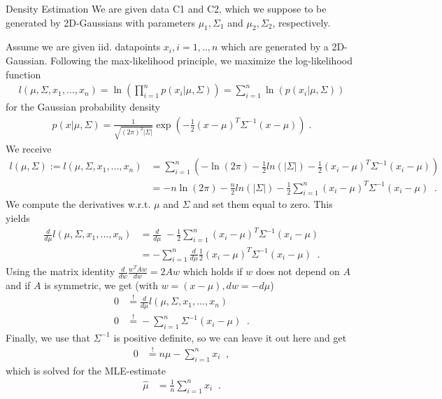 \documentclass[
ngerman,
]{tudaexercise}
\newcommand{\sni}{\sum_{i=1}^{n}}
\begin{document}
	\begin{task}{Density Estimation}
		We are given data C1 and C2, which we suppose to be generated by 2D-Gaussians with parameters ${\mu_1,\Sigma_1}$ and ${\mu_2,\Sigma_2}$, respectively.
		\begin{subtask}
	Assume we are given iid. datapoints $x_i, i=1,..,n$ which are generated by a 2D-Gaussian. Following the max-likelihood principle, we maximize the log-likelihood function
	\begin{align*}
	l(\mu,\Sigma,x_1,...,x_n)=\ln(\prod_{i=1}^n p(x_i|\mu,\Sigma))=\sni\ln(p(x_i|\mu,\Sigma))
	\end{align*}
	for the Gaussian probability density
	\begin{align}\label{gaussian} p(x|\mu,\Sigma)=\frac{1}{\sqrt{(2\pi)^2|\Sigma|}}\exp\left( -\frac{1}{2}(x-\mu)^T\Sigma^{-1}(x-\mu)\right)\;.
	\end{align}
	We receive
	\begin{align}
	l(\mu,\Sigma):=l(\mu,\Sigma,x_1,...,x_n)&=\sni\left( -\ln(2\pi)-\frac{1}{2}ln(|\Sigma|)-\frac{1}{2}(x_i-\mu)^T\Sigma^{-1}(x_i-\mu)\right) \\
	&=-n \ln(2\pi)-\frac{n}{2}ln(|\Sigma|)-\frac{1}{2}\sni (x_i-\mu)^T\Sigma^{-1}(x_i-\mu)\;\;.\label{lfkt}
	\end{align}
	We compute the derivatives w.r.t. $\mu$ and $\Sigma$ and set them equal to zero. This yields
	\begin{align*}
	\frac{d}{d\mu}l(\mu,\Sigma,x_1,...,x_n)&=\frac{d}{d\mu}\; -\frac{1}{2}\sni (x_i-\mu)^T\Sigma^{-1} (x_i-\mu)\\ &= -\sni \frac{d}{d\mu}\frac{1}{2}(x_i-\mu)^T\Sigma^{-1} (x_i-\mu)\;\;.
	\end{align*}
	Using the matrix identity $\frac{d}{dw}\frac{w^T Aw}{dw}=2Aw$ which holds if $w$ does not depend on $A$ and if $A$ is symmetric, we get (with $w=(x-\mu), dw=-d\mu$)
	\begin{align*}
	0&\stackrel{!}{=}\frac{d}{d\mu}l(\mu,\Sigma,x_1,...,x_n)\\
	0&\stackrel{!}{=}-\sni \Sigma^{-1}(x_i-\mu)	\;\;.
	\end{align*}
	Finally, we use that $\Sigma^{-1}$ is positive definite, so we can leave it out here and get
	\begin{align*}
	0&\stackrel{!}{=}n\mu-\sni x_i\;\;,
	\end{align*}
	which is solved for the MLE-estimate
	\begin{align}\label{mean}
	\hat{\mu}&=\frac{1}{n}\sni x_i\;\;.
	\end{align}

\end{subtask}
\end{task}
\end{document}
